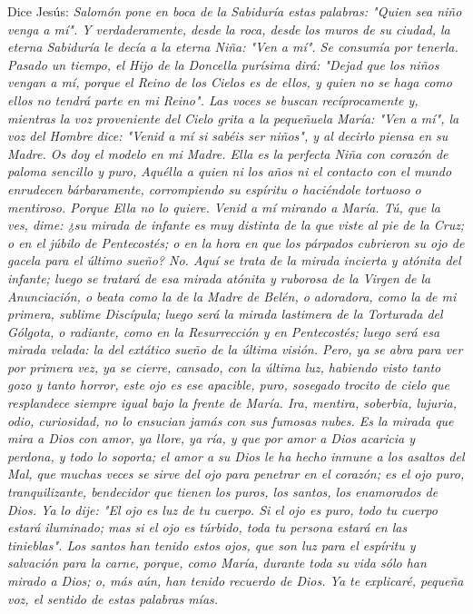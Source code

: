 \documentclass[12pt, twoside, openright]{book} %
\begin{document}
Dice Jesús: 
\emph{Salomón pone en boca de la Sabiduría estas palabras: "Quien sea niño venga a mí". Y verdaderamente, desde la roca, desde los muros de su ciudad, la eterna Sabiduría le decía a la eterna Niña: "Ven a mí". Se consumía por tenerla. Pasado un tiempo, el Hijo de la Doncella purísima dirá: "Dejad que los niños vengan a mí, porque el Reino de los Cielos es de ellos, y quien no se haga como ellos no tendrá parte en mi Reino". Las voces se buscan recíprocamente y, mientras la voz proveniente del Cielo grita a la pequeñuela María: "Ven a mí", la voz del Hombre dice: "Venid a mí si sabéis ser niños", y al decirlo piensa en su Madre. Os doy el modelo en mi Madre. Ella es la perfecta Niña con corazón de paloma sencillo y puro, Aquélla a quien ni los años ni el contacto con el mundo enrudecen bárbaramente, corrompiendo su espíritu o haciéndole tortuoso o mentiroso. Porque Ella no lo quiere. Venid a mí mirando a María. Tú, que la ves, dime: ¿su mirada de infante es muy distinta de la que viste al pie de la Cruz; o en el júbilo de Pentecostés; o en la hora en que los párpados cubrieron su ojo de gacela para el último sueño? No. Aquí se trata de la mirada incierta y atónita del infante; luego se tratará de esa mirada atónita y ruborosa de la Virgen de la Anunciación, o beata como la de la Madre de Belén, o adoradora, como la de mi primera, sublime Discípula; luego será la mirada lastimera de la Torturada del Gólgota, o radiante, como en la Resurrección y en Pentecostés; luego será esa mirada velada: la del extático sueño de la última visión. Pero, ya se abra para ver por primera vez, ya se cierre, cansado, con la última luz, habiendo visto tanto gozo y tanto horror, este ojo es ese apacible, puro, sosegado trocito de cielo que resplandece siempre igual bajo la frente de María. Ira, mentira, soberbia, lujuria, odio, curiosidad, no lo ensucian jamás con sus fumosas nubes. Es la mirada que mira a Dios con amor, ya llore, ya ría, y que por amor a Dios acaricia y perdona, y todo lo soporta; el amor a su Dios le ha hecho inmune a los asaltos del Mal, que muchas veces se sirve del ojo para penetrar en el corazón; es el ojo puro, tranquilizante, bendecidor que tienen los puros, los santos, los enamorados de Dios. Ya lo dije: "El ojo es luz de tu cuerpo. Si el ojo es puro, todo tu cuerpo estará iluminado; mas si el ojo es túrbido, toda tu persona estará en las tinieblas". Los santos han tenido estos ojos, que son luz para el espíritu y salvación para la carne, porque, como María, durante toda su vida sólo han mirado a Dios; o, más aún, han tenido recuerdo de Dios. Ya te explicaré, pequeña voz, el sentido de estas palabras mías. }
 
\end{document}
